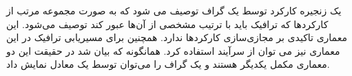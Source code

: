 یک زنجیره کارکرد توسط یک گراف  توصیف می شود که
به صورت مجموعه مرتب از کارکردها که ترافیک باید با ترتیب مشخصی از آن‌ها عبور کند توصیف می‌‌شود.
این معماری تاکیدی بر مجازی‌سازی کارکردها ندارد.
همچنین برای مسیریابی ترافیک در این معماری نیز می توان از سرآیند  استفاده کرد.
همانگونه که بیان شد در حقیقت این دو معماری مکمل یکدیگر هستند و
یک گراف  را می‌توان توسط یک  معادل نمایش داد.